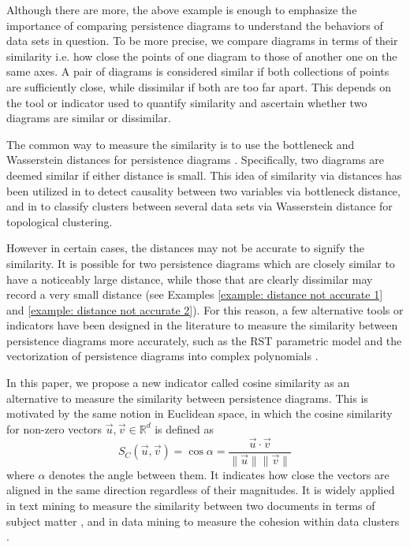 \documentclass[sn-mathphys-num]{sn-jnl}%
\theoremstyle{thmstyleone}%
\theoremstyle{thmstyletwo}%
\theoremstyle{thmstylethree}%
\begin{document}
Although there are more, the above example is enough to emphasize the importance of comparing persistence diagrams to understand the behaviors of data sets in question. To be more precise, we compare diagrams in terms of their similarity i.e. how close the points of one diagram to those of another one on the same axes. A pair of diagrams is considered similar if both collections of points are sufficiently close, while dissimilar if both are too far apart. This depends on the tool or indicator used to quantify similarity and ascertain whether two diagrams are similar or dissimilar. 

The common way to measure the similarity is to use the bottleneck and Wasserstein distances for persistence diagrams \cite{Edelsbrunner,Dey}. Specifically, two diagrams are deemed similar if either distance is small. This idea of similarity via distances has been utilized in \cite{Bando} to detect causality between two variables via bottleneck distance, and in \cite{Fariha_3} to classify clusters between several data sets via Wasserstein distance for topological clustering.

However in certain cases, the distances may not be accurate to signify the similarity. It is possible for two persistence diagrams which are closely similar to have a noticeably large distance, while those that are clearly dissimilar may record a very small distance (see Examples \ref{example: distance not accurate 1} and \ref{example: distance not accurate 2}). For this reason, a few alternative tools or indicators have been designed in the literature to measure the similarity between persistence diagrams more accurately, such as the RST parametric model \cite{Agami} and the vectorization of persistence diagrams into complex polynomials \cite{DiFabio}.

In this paper, we propose a new indicator called cosine similarity as an alternative to measure the similarity between persistence diagrams. This is motivated by the same notion in Euclidean space, in which the cosine similarity for non-zero vectors $\vec{u},\vec{v} \in \mathbb{R}^d$ is defined as
\begin{equation*}
	S_C(\vec{u},\vec{v})=\cos\alpha = \frac{\vec{u} \cdot \vec{v}}{\|\vec{u}\|\|\vec{v}\|}
\end{equation*}
where $\alpha$ denotes the angle between them. It indicates how close the vectors are aligned in the same direction regardless of their magnitudes. It is widely applied in text mining to measure the similarity between two documents in terms of subject matter \cite{Wang}, and in data mining to measure the cohesion within data clusters \cite{Tan}.
\end{document}
